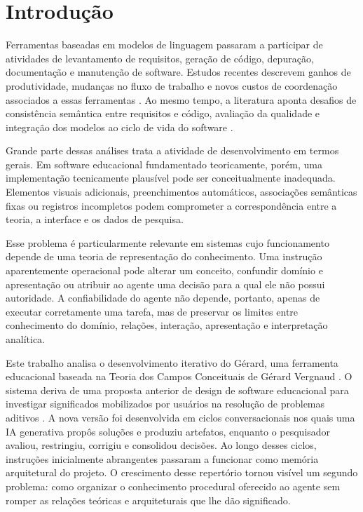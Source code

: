 \documentclass[preprint,12pt,authoryear]{elsarticle}
\newcommand{\gerard}{Gérard\xspace}
\begin{document}
\section{Introdução}
Ferramentas baseadas em modelos de linguagem passaram a participar de atividades de levantamento de requisitos, geração de código, depuração, documentação e manutenção de software. Estudos recentes descrevem ganhos de produtividade, mudanças no fluxo de trabalho e novos custos de coordenação associados a essas ferramentas \citep{ulfsnes2024transforming,song2024impact}. Ao mesmo tempo, a literatura aponta desafios de consistência semântica entre requisitos e código, avaliação da qualidade e integração dos modelos ao ciclo de vida do software \citep{zhang2024agilegen,gao2024challenges}.

Grande parte dessas análises trata a atividade de desenvolvimento em termos gerais. Em software educacional fundamentado teoricamente, porém, uma implementação tecnicamente plausível pode ser conceitualmente inadequada. Elementos visuais adicionais, preenchimentos automáticos, associações semânticas fixas ou registros incompletos podem comprometer a correspondência entre a teoria, a interface e os dados de pesquisa.

Esse problema é particularmente relevante em sistemas cujo funcionamento depende de uma teoria de representação do conhecimento. Uma instrução aparentemente operacional pode alterar um conceito, confundir domínio e apresentação ou atribuir ao agente uma decisão para a qual ele não possui autoridade. A confiabilidade do agente não depende, portanto, apenas de executar corretamente uma tarefa, mas de preservar os limites entre conhecimento do domínio, relações, interação, apresentação e interpretação analítica.

Este trabalho analisa o desenvolvimento iterativo do \gerard, uma ferramenta educacional baseada na Teoria dos Campos Conceituais de Gérard Vergnaud \citep{vergnaud1990theorie,vergnaud1991nino,vergnaud1997nature,vergnaud1998representation}. O sistema deriva de uma proposta anterior de design de software educacional para investigar significados mobilizados por usuários na resolução de problemas aditivos \citep{braga2008design}. A nova versão foi desenvolvida em ciclos conversacionais nos quais uma IA generativa propôs soluções e produziu artefatos, enquanto o pesquisador avaliou, restringiu, corrigiu e consolidou decisões. Ao longo desses ciclos, instruções inicialmente abrangentes passaram a funcionar como memória arquitetural do projeto. O crescimento desse repertório tornou visível um segundo problema: como organizar o conhecimento procedural oferecido ao agente sem romper as relações teóricas e arquiteturais que lhe dão significado.
\end{document}
